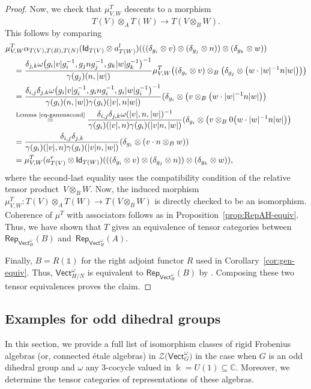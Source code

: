 \documentclass[pdftex]{sigma}
\numberwithin{equation}{section}
\newcommand{\ov}[1]{\overline{#1}}
\newcommand{\ide}{\mathsf{Id}}
\newcommand{\one}{\mathds{1}}
\newcommand{\Rep}{\mathsf{Rep}}
\newcommand{\Vect}{\mathsf{Vect}}
\newcommand{\mC}{\mathbb{C}}
\newcommand{\cZ}{\mathcal{Z}}
\begin{document}
\begin{proof}
Now, we check that $\mu_{V,W}^T$ descents to a morphism
\[T(V)\otimes_A T(W)\to T(V\otimes_B W).\]
This follows by comparing
\begin{align*}
 &\mu^{T}_{V,W}\alpha_{T(V),T(B),T(N)}(\ide_{T(V)}\otimes a^l_{T(W)})(((\delta_{g_i}\otimes v)\otimes (\delta_{g_j}\otimes n))\otimes (\delta_{g_k}\otimes w))\\
 &\quad=\frac{\delta_{j,k}\omega\big(g_i|v|g_i^{-1},g_jng_j^{-1},g_k|w|g_k^{-1}\big)^{-1}}{\gamma(g_j)(n,|w|)}\mu^{T}_{V,W}\big((\delta_{g_i}\otimes v)\otimes_B \big(\delta_{g_j}\otimes \big(w\cdot|w|^{-1}n|w|\big)\big)\big)\\
 &\quad=\frac{\delta_{i,j}\delta_{j,k}\omega\big(g_i|v|g_i^{-1},g_ing_i^{-1},g_i|w|g_i^{-1}\big)^{-1}}{\gamma(g_i)(n,|w|)\gamma(g_i)(|v|,n|w|)}(\delta_{g_i}\otimes \big(v\otimes_B \big(w\cdot|w|^{-1}n|w|\big)\big)\\
 &\quad\stackrel{\text{Lemma~\ref{eq-gammacond}}}{=} \frac{\delta_{i,j}\delta_{j,k}\omega(|v|,n,|w|)^{-1}}{\gamma(g_i)(|v|,n)\gamma(g_i)(|v|n,|w|)}(\delta_{g_i}\otimes \big(v\otimes_B 0 \big(w\cdot |w|^{-1}n|w|\big)\big)\\
 &\quad=\frac{\delta_{i,j}\delta_{j,k}}{\gamma(g_i)(|v|,n)\gamma(g_i)(|v|n,|w|)}(\delta_{g_i}\otimes (v\cdot n\otimes_B w))\\
 &\quad=\mu_{V,W}^T(a_{T(V)}^r\otimes \ide_{T(W)})(((\delta_{g_i}\otimes v)\otimes (\delta_{g_j}\otimes n))\otimes (\delta_{g_k}\otimes w)),
\end{align*}
where the second-last equality uses the compatibility condition of the relative tensor product~${V\otimes_B W}$. Now, the induced morphism $\mu_{V,W}^T\colon T(V)\otimes_A T(W)\to T(V\otimes_B W)$ is directly checked to be an isomorphism. Coherence of $\mu^T$ with associators follows as in Proposition~\ref{prop:RepAH-equiv}. Thus, we have shown that $T$ gives an equivalence of tensor categories between $\Rep_{\Vect_H^\omega}(B)$ and~$\Rep_{\Vect_H^\omega}(A)$.

Finally, $B=R(\one)$ for the right adjoint functor $R$ used in Corollary~\ref{cor:gen-equiv}. Thus, $\Vect_{H/N}^{\ov{\omega}}$ is equivalent to $\Rep_{\Vect_H^\omega}(B)$ by \cite[Proposition 6.1]{BN11}. Composing these two tensor equivalences proves the claim.
\end{proof}

\subsection{Examples for odd dihedral groups}\label{sec:expl}
In this section, we provide a full list of isomorphism classes of rigid Frobenius algebras (or, connected \'etale algebras) in $\cZ\big(\Vect_G^\omega\big)$ in the case when $G$ is an odd dihedral group and $\omega$ any $3$-cocycle valued in $\Bbbk=U(1)\subseteq \mC$. Moreover, we determine the tensor categories of representations of these algebras.
\end{document}
